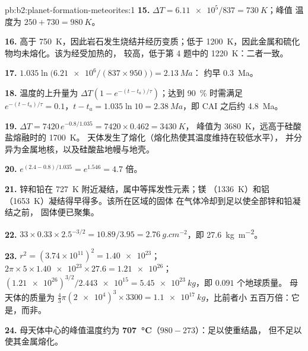 \begin{solution}{pb:b2:planet-formation-meteorites:1}
\textbf{15.} $\Delta T = \num{6.11e5}/837 = \qty{730}{K}$；峰值
温度为 $250 + 730 = \qty{980}{K}$。

\textbf{16.} 高于 \qty{750}{K}，因此岩石发生烧结并经历变质；低于
\qty{1200}{K}，因此金属和硫化物均未熔化。该为经受加热的，
较高，低于第 4 题中的 \qty{1220}{K}：二者一致。

\textbf{17.} $1.035\ln\bigl(\num{6.21e6}/(837\times950)\bigr) = \qty{2.13}{Ma}$：
约早 \qty{0.3}{Ma}。

\textbf{18.} 温度的上升量为 $\Delta T(1 - e^{-(t - t_a)/\tau})$；达到 \qty{90}{\percent}
时需满足 $e^{-(t - t_a)/\tau} = 0.1$，$t - t_a = 1.035\ln10 = \qty{2.38}{Ma}$，即
CAI 之后约 \qty{4.8}{Ma}。

\textbf{19.} $\Delta T = 7420\,e^{-0.8/1.035} = 7420\times0.462 = \qty{3430}{K}$，
峰值为 \qty{3680}{K}，远高于硅酸盐熔融时的 \qty{1700}{K}。
天体发生了熔化（熔化热使其温度维持在较低水平），
并分异为金属地核，以及硅酸盐地幔与地壳。

\textbf{20.} $e^{(2.4 - 0.8)/1.035} = e^{1.546} = 4.7$ 倍。

\textbf{21.} 锌和铅在 \qty{727}{K} 附近凝结，属中等挥发性元素；镁
（\qty{1336}{K}）和铝（\qty{1653}{K}）凝结得早得多。该所在区域的固体
在气体冷却到足以使全部锌和铅凝结之前，
固体便已聚集。

\textbf{22.} $33\times0.33\times2.5^{-3/2} = 10.89/3.95 = \qty{2.76}{g.cm^{-2}}$，即
\qty{27.6}{kg.m^{-2}}。

\textbf{23.} $r^2 = (3.74\times10^{11})^2 = \num{1.40e23}$；
$2\pi\times5\times\num{1.40e23}\times27.6 = \num{1.21e26}$；
$(\num{1.21e26})^{3/2}/\num{2.443e15} = \qty{5.45e23}{kg}$，即 $0.091$ 个地球质量。
母天体的质量为 $\tfrac43\pi(\num{2e4})^3\times3300 = \qty{1.1e17}{kg}$，比前者小
五百万倍：它是，而非。

\textbf{24.} 母天体中心的峰值温度约为
\textbf{\qty[text-series-to-math=true]{707}{\degreeCelsius}}（$980 - 273$）：足以使重结晶，
但不足以使其金属熔化。
\end{solution}
